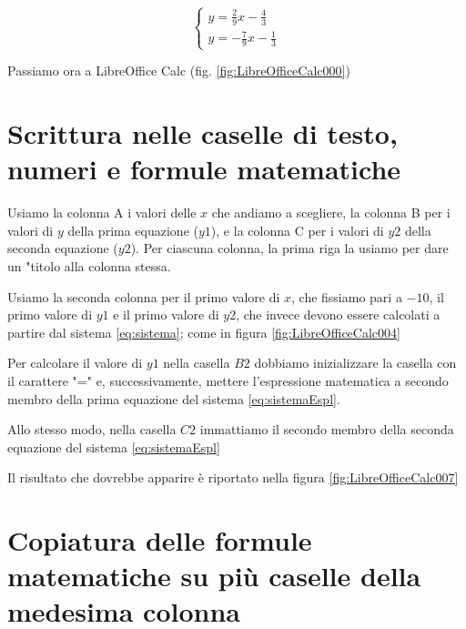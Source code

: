 \documentclass[17pt]{extarticle}
\begin{document}
\begin{equation}\label{eq:sistemaEspl}
  	\begin{cases}
		y = \frac{2}{9}x - \frac{4}{3}\\
		y = -\frac{7}{9}x - \frac{1}{3}
	\end{cases}
\end{equation}


Passiamo ora a LibreOffice Calc (fig. \ref{fig:LibreOfficeCalc000})


\newpage

\section{Scrittura nelle caselle di testo, numeri e formule matematiche}

Usiamo la colonna A i valori delle $x$ che andiamo a scegliere, la colonna B per i valori di $y$ della prima equazione ($y1$), e la colonna C per i valori di $y2$ della seconda equazione ($y2$). Per ciascuna colonna, la prima riga la usiamo per dare un "titolo alla colonna stessa.

Usiamo la seconda colonna per il primo valore di $x$, che fissiamo pari a $-10$, il primo valore di $y1$ e il primo valore di $y2$, che invece devono essere calcolati a partire dal sistema \ref{eq:sistema}; come in figura \ref{fig:LibreOfficeCalc004}




Per calcolare il valore di $y1$ nella casella $B2$ dobbiamo inizializzare la casella con il carattere "=" e, successivamente, mettere l'espressione matematica a secondo membro della prima equazione del sistema \ref{eq:sistemaEspl}.



Allo stesso modo, nella casella $C2$ immattiamo il secondo membro della seconda equazione del sistema \ref{eq:sistemaEspl}



Il risultato che dovrebbe apparire è riportato nella figura \ref{fig:LibreOfficeCalc007}




\newpage
\section{Copiatura delle formule matematiche su più caselle della medesima colonna}
\end{document}
